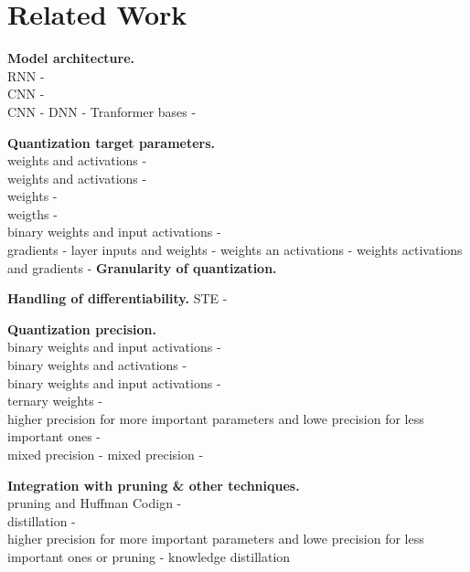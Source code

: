 \chapter{Related Work\label{cha:chapter5}}

\noindent
\textbf{Model architecture.}\\
RNN - \cite{ott2016rnn}\\
CNN - \cite{rastegari2016xnor}\\
CNN - \cite{courbariaux2015binaryconnect}
DNN - \cite{yunchao2014compressing}
Tranformer bases - \cite{kim2021ibert}

\noindent
\textbf{Quantization target parameters.}\\
weights and activations - \cite{krishnamoorthi2018quantizing}\\
weights and activations - \cite{hubara2016qnn}\\
weights - \cite{polino2018modelcompression}\\
weigths - \cite{ott2016rnn}\\
binary weights and input activations - \cite{rastegari2016xnor}\\
gradients - \cite{shuchang2016dorafenet}
layer inputs and weights - \cite{Edouard2022SPIQ} 
weights an activations -  \cite{DBLP:conf/eccv/ZhangYYH18}
weights activations and gradients - \cite{shuchang2016dorafenet}
\noindent
\textbf{Granularity of quantization.}

\noindent
\textbf{Handling of differentiability.}
STE -  \cite{DBLP:conf/eccv/ZhangYYH18}

\noindent
\textbf{Quantization precision.}\\
binary weights and input activations - \cite{courbariaux2015binaryconnect}\\
binary weights and activations - \cite{hubara2016qnn}\\
binary weights and input activations - \cite{rastegari2016xnor}\\
ternary weights - \cite{ott2016rnn}\\
higher precision for more important parameters and lowe precision for less important ones - \cite{soroosh2018adaptive}\\
mixed precision - \cite{DBLP:conf/eccv/WangLGAC22}
mixed precision - \cite{DBLP:journals/ijcv/DongNLCSZ19}

\noindent
\textbf{Integration with pruning \& other techniques.}\\
pruning and Huffman Codign - \cite{han2016deepcompression}\\
distillation - \cite{polino2018modelcompression}\\
higher precision for more important parameters and lowe precision for less important ones or pruning - \cite{soroosh2018adaptive}
knowledge distillation \cite{DBLP:conf/eccv/WeiPQOY18}

